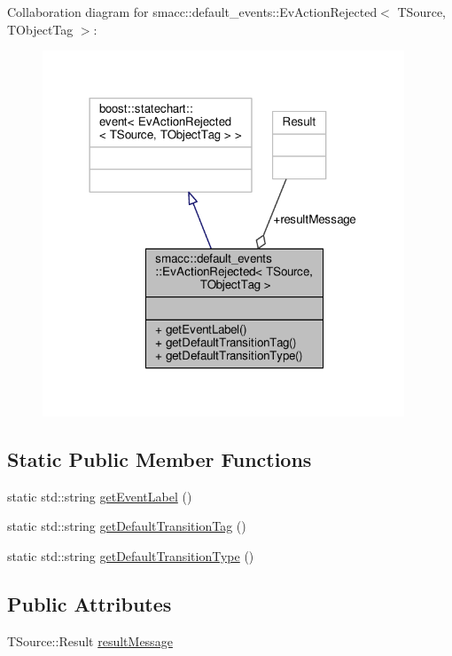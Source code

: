 Collaboration diagram for smacc\+:\+:default\+\_\+events\+:\+:Ev\+Action\+Rejected$<$ T\+Source, T\+Object\+Tag $>$\+:\nopagebreak
\begin{figure}[H]
\begin{center}
\leavevmode
\includegraphics[width=306pt]{structsmacc_1_1default__events_1_1EvActionRejected__coll__graph}
\end{center}
\end{figure}
\subsection*{Static Public Member Functions}
\begin{DoxyCompactItemize}
\item 
static std\+::string \hyperlink{structsmacc_1_1default__events_1_1EvActionRejected_ad86fe8ccabe089f94cfaffdde3dadd0b}{get\+Event\+Label} ()
\item 
static std\+::string \hyperlink{structsmacc_1_1default__events_1_1EvActionRejected_af826dc01da958697898f0f70801f87d6}{get\+Default\+Transition\+Tag} ()
\item 
static std\+::string \hyperlink{structsmacc_1_1default__events_1_1EvActionRejected_a2ab427b06156f1c1776cb93d0277c025}{get\+Default\+Transition\+Type} ()
\end{DoxyCompactItemize}
\subsection*{Public Attributes}
\begin{DoxyCompactItemize}
\item 
T\+Source\+::\+Result \hyperlink{structsmacc_1_1default__events_1_1EvActionRejected_a40b6bcf337a76104499c82d0c4d5a49f}{result\+Message}
\end{DoxyCompactItemize}


